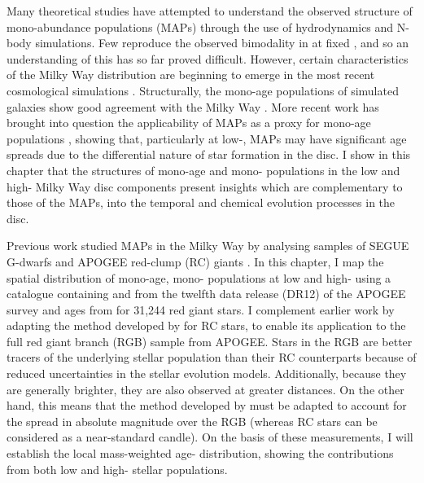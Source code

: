  Many theoretical studies have attempted to understand the observed structure of mono-abundance populations (MAPs) through the use of hydrodynamics and N-body simulations. Few reproduce the observed bimodality in \afe{} at fixed \feh{}, and so an understanding of this has so far proved difficult. However, certain characteristics of the Milky Way \afe{} distribution are beginning to emerge in the most recent cosmological simulations  \citep{2016arXiv160804133M}. Structurally, the mono-age populations of simulated galaxies show good agreement with the Milky Way \citep[e.g.][]{2013MNRAS.436..625S,2013ApJ...773...43B,2014MNRAS.442.2474M,2014MNRAS.443.2452M}. More recent work has brought into question the applicability of MAPs as a proxy for mono-age populations \citep{2017ApJ...834...27M}, showing that, particularly at low-\afe{}, MAPs may have significant age spreads due to the differential nature of star formation in the disc. I show in this chapter that the structures of mono-age and mono-\feh{} populations in the low and high-\afe{} Milky Way disc components present insights which are complementary to those of the MAPs, into the temporal and chemical evolution processes in the disc.

 Previous work studied MAPs in the Milky Way by analysing samples of SEGUE G-dwarfs \citep{2012ApJ...755..115B,2012ApJ...753..148B,2012ApJ...751..131B} and APOGEE red-clump (RC) giants \citep{2016ApJ...823...30B}. In this chapter, I map the spatial distribution of mono-age, mono-\feh{} populations at low and high-\afe{} using a catalogue containing \feh{} and \afe{} from the twelfth data release (DR12) of the APOGEE survey \citep{2015arXiv150905420M} and ages from \citet{2016MNRAS.456.3655M} for 31,244 red giant stars. I complement earlier work by adapting the method developed by \citet{2016ApJ...823...30B} for RC stars, to enable its application to the full red giant branch (RGB) sample from APOGEE. Stars in the RGB are better tracers of the underlying stellar population than their RC counterparts because of reduced uncertainties in the stellar evolution models. Additionally, because they are generally brighter, they are also observed at greater distances. On the other hand, this means that the method developed by \citet{2016ApJ...823...30B} must be adapted to account for the spread in absolute magnitude over the RGB (whereas RC stars can be considered as a near-standard candle). On the basis of these measurements, I will establish the local mass-weighted age-\feh{} distribution, showing the contributions from both low and high-\afe{} stellar populations.

